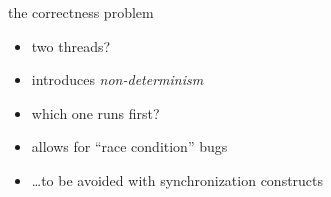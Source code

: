 \begin{frame}{the correctness problem}
\begin{itemize}
\item two threads?
\item introduces \textit{non-determinism}
\item which one runs first?
\vspace{.5cm}
\item allows for ``race condition'' bugs
\item \ldots to be avoided with synchronization constructs
\end{itemize}
\end{frame}
